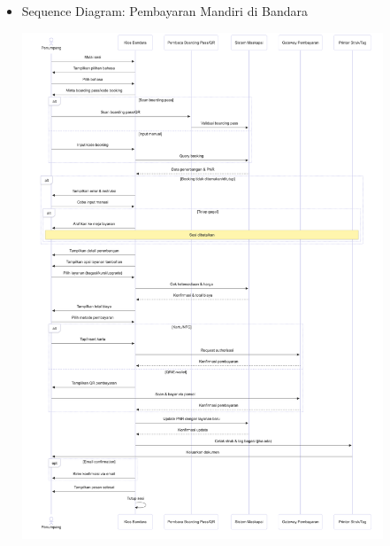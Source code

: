 \documentclass[a4paper]{article}
\begin{document}
\begin{enumerate}[itemsep=1em]
  \begin{itemize}[itemsep=1em]
    \item Sequence Diagram: Pembayaran Mandiri di Bandara
    \begin{center}
      \includegraphics[width=0.85\textwidth,keepaspectratio]{airport-payment-sequence-diagram.png}
    \end{center}
  \end{itemize}
  
  \pagebreak


\end{enumerate}
\end{document}
